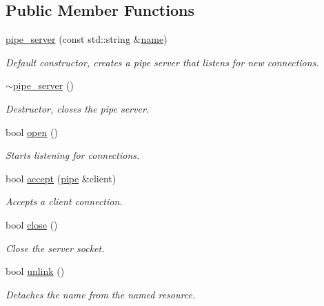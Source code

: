 \subsection*{Public Member Functions}
\begin{DoxyCompactItemize}
\item 
\mbox{\label{classcpen333_1_1process_1_1posix_1_1pipe__server_ac7c117eb8d63a079a4b0dab04b715247}} 
\hyperlink{classcpen333_1_1process_1_1posix_1_1pipe__server_ac7c117eb8d63a079a4b0dab04b715247}{pipe\+\_\+server} (const std\+::string \&\hyperlink{classcpen333_1_1process_1_1impl_1_1named__resource__base_a53986a0a1dd26a3602b842c45613b79d}{name})
\begin{DoxyCompactList}\small\item\em Default constructor, creates a pipe server that listens for new connections. \end{DoxyCompactList}\item 
\mbox{\label{classcpen333_1_1process_1_1posix_1_1pipe__server_a632a13c5f56c0722b347cafb9b276521}} 
\hyperlink{classcpen333_1_1process_1_1posix_1_1pipe__server_a632a13c5f56c0722b347cafb9b276521}{$\sim$pipe\+\_\+server} ()
\begin{DoxyCompactList}\small\item\em Destructor, closes the pipe server. \end{DoxyCompactList}\item 
bool \hyperlink{classcpen333_1_1process_1_1posix_1_1pipe__server_afcb8bad74a3f5540e2dba294a2bb1e5a}{open} ()
\begin{DoxyCompactList}\small\item\em Starts listening for connections. \end{DoxyCompactList}\item 
bool \hyperlink{classcpen333_1_1process_1_1posix_1_1pipe__server_a9acf7d28f7b58a58f04360110cae1fff}{accept} (\hyperlink{classcpen333_1_1process_1_1posix_1_1pipe}{pipe} \&client)
\begin{DoxyCompactList}\small\item\em Accepts a client connection. \end{DoxyCompactList}\item 
bool \hyperlink{classcpen333_1_1process_1_1posix_1_1pipe__server_a3c13c11fb1ca6cecb65992d11b4fe56a}{close} ()
\begin{DoxyCompactList}\small\item\em Close the server socket. \end{DoxyCompactList}\item 
bool \hyperlink{classcpen333_1_1process_1_1posix_1_1pipe__server_a5c4da1864cb0db53e76d960230f3a83a}{unlink} ()
\begin{DoxyCompactList}\small\item\em Detaches the name from the named resource. \end{DoxyCompactList}\end{DoxyCompactItemize}
